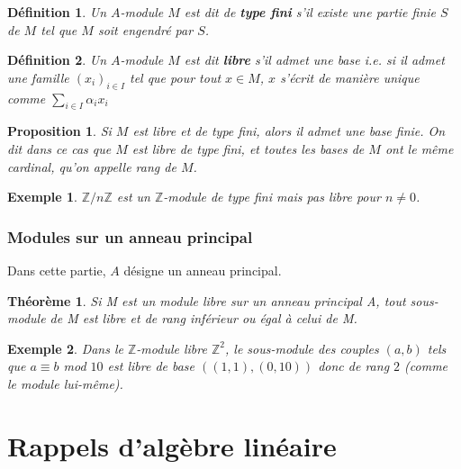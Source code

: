 \documentclass[a4paper,12pt]{report}  %
\theoremstyle{definitionstyle}
\newtheorem{definition}{Définition}[chapter] %
\theoremstyle{examplestyle}
\newtheorem{example}{Exemple}[chapter] %
\theoremstyle{remarkstyle}
\theoremstyle{propositionstyle}
\newtheorem{proposition}{Proposition}[chapter]  %
\theoremstyle{theoremstyle}
\newtheorem{theoreme}{Théorème}[chapter]  %
\begin{document}
	
	
	\begin{definition}
		Un $A$-module $M$ est dit de \textbf{type fini} s'il existe une partie finie $S$ de $M$ tel que $M$ soit engendré par $S$.
	\end{definition}

	\begin{definition}
		Un $A$-module $M$ est dit \textbf{libre} s'il admet une base i.e. si il admet une famille $(x_i)_{i \in I}$ tel que pour tout $x \in M$, $x$ s'écrit de manière unique comme $\sum_{i \in I} \alpha_i x_i$
	\end{definition}

	\begin{proposition}
		Si $M$ est libre et de type fini, alors il admet une base finie. On dit dans ce cas que $M$ est libre de type fini, et toutes les bases de $M$ ont le même cardinal, qu'on appelle rang de $M$.
	\end{proposition}

	\begin{example}
		$\mathbb{Z}/n \mathbb{Z}$ est un $\mathbb{Z}$-module de type fini mais pas libre pour $n \neq 0$.
	\end{example}
		
	\subsection{Modules sur un anneau principal}
	Dans cette partie, $A$ désigne un anneau principal.
	
	\begin{theoreme}
	Si M est un module libre sur un anneau principal A, tout sous-module de M est libre et de rang inférieur ou égal à celui de M.
	\end{theoreme}


	\begin{example}
		Dans le $\mathbb{Z}$-module libre $\mathbb{Z}^2$, le sous-module des couples $(a, b)$ tels que $a \equiv b$ mod $10$ est libre de base $((1,1), (0, 10))$ donc de rang $2$ (comme le module lui-même).
	\end{example}
	
	
	
	\chapter{Rappels d'algèbre linéaire}
	
\end{document}
